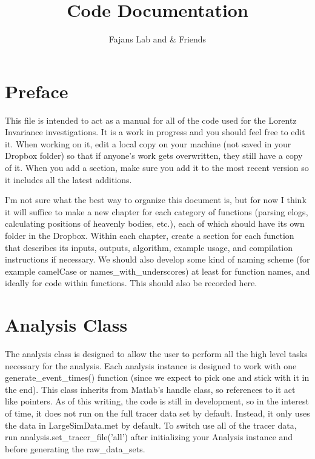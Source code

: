 \documentclass[12pt]{report}
\author{Fajans Lab and \& Friends}
\title{Code Documentation}
\begin{document}
\maketitle

\chapter*{Preface}
This file is intended to act as a manual for all of the code used for the Lorentz Invariance investigations.  It is a work in progress and you should feel free to edit it.  When working on it, edit a local copy on your machine (not saved in your Dropbox folder) so that if anyone's work gets overwritten, they still have a copy of it.  When you add a section, make sure you add it to the most recent version so it includes all the latest additions.

I'm not sure what the best way to organize this document is, but for now I think it will suffice to make a new chapter for each category of functions (parsing elogs, calculating positions of heavenly bodies, etc.), each of which should have its own folder in the Dropbox.  Within each chapter, create a section for each function that describes its inputs, outputs, algorithm, example usage, and compilation instructions if necessary.  We should also develop some kind of naming scheme (for example camelCase or names\_with\_underscores) at least for function names, and ideally for code within functions.  This should also be recorded here.

\tableofcontents



\chapter{Analysis Class}
The analysis class is designed to allow the user to perform all the high level tasks necessary for the analysis.  Each analysis instance is designed to work with one generate\_event\_times() function (since we expect to pick one and stick with it in the end).  This class inherits from Matlab's handle class, so references to it act like pointers.  As of this writing, the code is still in development, so in the interest of time, it does not run on the full tracer data set by default.  Instead, it only uses the data in LargeSimData.met by default.  To switch use all of the tracer data, run analysis.set\_tracer\_file('all') after initializing your Analysis instance and before generating the raw\_data\_sets.
\end{document}
